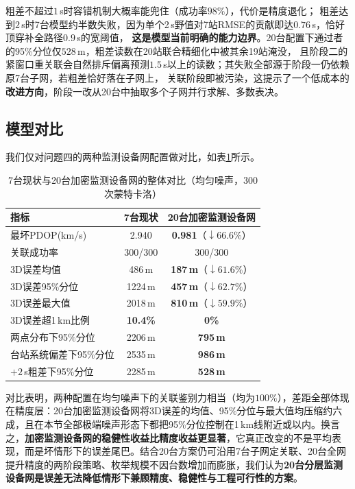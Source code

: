 \documentclass[draft,12pt,a4paper]{ctexart}
\theoremstyle{definition}
\begin{document}
粗差不超过$1$\,s时容错机制大概率能兜住（成功率$98\%$），代价是精度退化；
粗差达到$2$\,s时7台模型约半数失败，因为单个2\,s野值对7站RMSE的贡献即达$0.76$\,s，恰好顶穿补全路径$0.9$\,s的宽阈值，
\textbf{这是模型当前明确的能力边界}。20台配置下通过者的95\%分位仅$528$\,m，粗差读数在20站联合精细化中被其余19站淹没，
且阶段二的紧窗口重关联会自然排斥偏离预测$1.5$\,s以上的读数；其失败全部源于阶段一仍依赖原7台子网，若粗差恰好落在子网上，
关联阶段即被污染，这提示了一个低成本的\textbf{改进方向}，阶段一改从20台中抽取多个子网并行求解、多数表决。

\subsection{模型对比}

我们仅对问题四的两种监测设备网配置做对比，如表\ref{tab:cmp-7v20}所示。

\begin{table}[H]\centering
  \caption{7台现状与20台加密监测设备网的整体对比（均匀噪声，300次蒙特卡洛）}\label{tab:cmp-7v20}
  \small
  \begin{tabular}{lcc}
    \toprule
    \textbf{指标} & \textbf{7台现状} & \textbf{20台加密监测设备网} \\
    \midrule
    最坏PDOP(km/s) & 2.940 & \textbf{0.981}（$\downarrow66.6\%$） \\
    关联成功率 & 300/300 & 300/300 \\
    3D误差均值 & 486\,m & \textbf{187\,m}（$\downarrow61.6\%$） \\
    3D误差95\%分位 & 1224\,m & \textbf{457\,m}（$\downarrow62.7\%$） \\
    3D误差最大值 & 2018\,m & \textbf{810\,m}（$\downarrow59.9\%$） \\
    3D误差超1\,km比例 & \textbf{10.4\%} & \textbf{0\%} \\
    两点分布下95\%分位 & 2206\,m & \textbf{795\,m} \\
    台站系统偏差下95\%分位 & 2535\,m & \textbf{986\,m} \\
    $+2$\,s粗差下95\%分位 & 2285\,m & \textbf{528\,m} \\
    \bottomrule
  \end{tabular}
\end{table}

对比表明，两种配置在均匀噪声下的关联鉴别力相当（均为$100\%$），差距全部体现在精度层：20台加密监测设备网将3D误差的均值、95\%分位与最大值均压缩约六成，且在本节全部极端噪声形态下都把95\%分位控制在1\,km线附近或以内。换言之，\textbf{加密监测设备网的稳健性收益比精度收益更显著}，它真正改变的不是平均表现，而是坏情形下的误差尾巴。结合20台方案仍可沿用7台子网定关联、20台全网提升精度的两阶段策略、枚举规模不因台数增加而膨胀，我们认为\textbf{20台分层监测设备网是误差无法降低情形下兼顾精度、稳健性与工程可行性的方案}。
\end{document}

